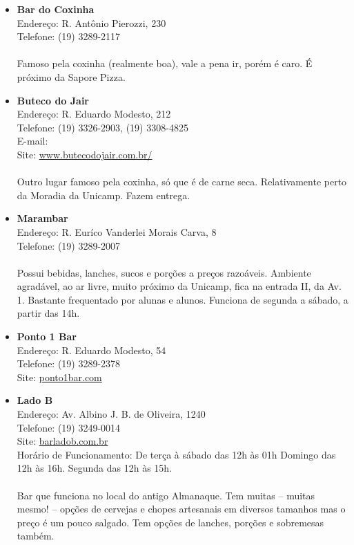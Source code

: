 \begin{itemize}
\item \textbf{Bar do Coxinha}
  \\Endereço: R. Antônio Pierozzi, 230
  \\Telefone: (19) 3289-2117
  \\
  \\Famoso pela coxinha (realmente boa), vale a pena ir, porém é caro. É
  próximo da Sapore Pizza.

\item \textbf{Buteco do Jair}
  \\Endereço: R. Eduardo Modesto, 212
  \\Telefone: (19) 3326-2903, (19) 3308-4825
  \\E-mail: 
  \\Site: \url{www.butecodojair.com.br/}
  \\
  \\Outro lugar famoso pela coxinha, só que é de carne seca. Relativamente
  perto da Moradia da Unicamp. Fazem entrega.

\item \textbf{Marambar}
  \\Endereço: R. Euríco Vanderlei Morais Carva, 8
  \\Telefone: (19) 3289-2007
  \\
  \\Possui bebidas, lanches, sucos e porções a preços razoáveis. Ambiente
  agradável, ao ar livre, muito próximo da Unicamp, fica na entrada II, da Av.
  1. Bastante frequentado por alunas e alunos. Funciona de segunda a sábado, a
  partir das 14h.

\item \textbf{Ponto 1 Bar}
  \\Endereço: R. Eduardo Modesto, 54
  \\Telefone: (19) 3289-2378
  \\Site: \url{ponto1bar.com}

  \item \textbf{Lado B}
  \\Endereço: Av. Albino J. B. de Oliveira, 1240
  \\Telefone: (19) 3249-0014
  \\Site: \url{barladob.com.br}
  \\Horário de Funcionamento: De terça à sábado das 12h às 01h
  Domingo das 12h às 16h. Segunda das 12h às 15h.
  \\
  \\Bar que funciona no local do antigo Almanaque. Tem muitas -- muitas mesmo!
  -- opções de cervejas e chopes artesanais em diversos tamanhos mas o preço é
  um pouco salgado. Tem opções de lanches, porções e sobremesas também.


\end{itemize}
